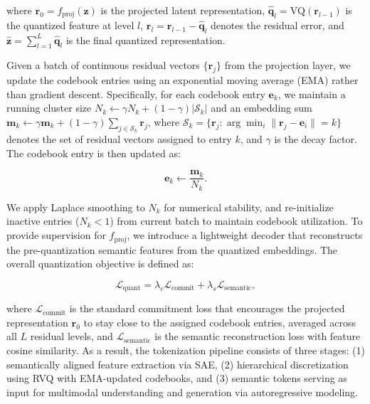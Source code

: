 \documentclass{article}
\begin{document}
where \(\mathbf{r}_0 = f_{\text{proj}}(\mathbf{z})\) is the projected latent representation, \(\hat{\mathbf{q}}_l = \text{VQ}(\mathbf{r}_{l-1})\) is the quantized feature at level \(l\), \(\mathbf{r}_l = \mathbf{r}_{l-1} - \hat{\mathbf{q}}_l\) denotes the residual error, and \(\hat{\mathbf{z}} = \sum_{l=1}^{L} \hat{\mathbf{q}}_l\) is the final quantized representation.

Given a batch of continuous residual vectors $\{\mathbf{r}_j\}$ from the projection layer, we update the codebook entries using an exponential moving average (EMA) \cite{van2017neural,rqvae} rather than gradient descent. Specifically, for each codebook entry $\mathbf{e}_k$, we maintain a running cluster size $N_k \leftarrow \gamma N_k + (1-\gamma)|\mathcal{S}_k|$ and an embedding sum $\mathbf{m}_k \leftarrow \gamma \mathbf{m}_k + (1-\gamma)\sum_{j \in \mathcal{S}_k} \mathbf{r}_j$, where $\mathcal{S}_k = \{ \mathbf{r}_j : \arg\min_i \|\mathbf{r}_j - \mathbf{e}_i\| = k \}$ denotes the set of residual vectors assigned to entry $k$, and $\gamma$ is the decay factor. The codebook entry is then updated as:

\begin{equation}
\mathbf{e}_k \leftarrow \frac{\mathbf{m}_k}{N_k}.
\end{equation}

We apply Laplace smoothing to $N_k$ for numerical stability, and re-initialize inactive entries ($N_k < 1$) from current batch to maintain codebook utilization.
To provide supervision for $f_{\text{proj}}$, we introduce a lightweight decoder that reconstructs the pre-quantization semantic features from the quantized embeddings. The overall quantization objective is defined as:

\begin{equation}
\mathcal{L}_{\text{quant}} = \lambda_c \mathcal{L}_{\text{commit}} + \lambda_s \mathcal{L}_{\text{semantic}},
\end{equation}

where $\mathcal{L}_{\text{commit}}$ is the standard commitment loss that encourages the projected representation $\mathbf{r}_0$ to stay close to the assigned codebook entries, averaged across all $L$ residual levels, and $\mathcal{L}_{\text{semantic}}$ is the semantic reconstruction loss with feature cosine similarity.
As a result, the tokenization pipeline consists of three stages: (1) semantically aligned feature extraction via SAE, (2) hierarchical discretization using RVQ with EMA-updated codebooks, and (3) semantic tokens serving as input for multimodal understanding and generation via autoregressive modeling.
\end{document}
